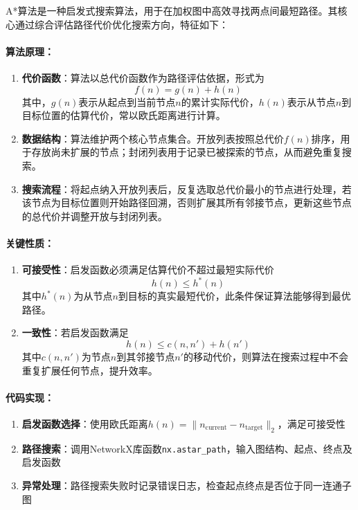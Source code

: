 A*算法是一种启发式搜索算法，用于在加权图中高效寻找两点间最短路径。其核心通过综合评估路径代价优化搜索方向，特征如下：

\paragraph{算法原理：}
\begin{enumerate}
    \item \textbf{代价函数}：算法以总代价函数作为路径评估依据，形式为
    \[
    f(n) = g(n) + h(n)
    \]
    其中，$g(n)$表示从起点到当前节点$n$的累计实际代价，$h(n)$表示从节点$n$到目标位置的估算代价，常以欧氏距离进行计算。

    \item \textbf{数据结构}：算法维护两个核心节点集合。开放列表按照总代价$f(n)$排序，用于存放尚未扩展的节点；封闭列表用于记录已被探索的节点，从而避免重复搜索。

    \item \textbf{搜索流程}：将起点纳入开放列表后，反复选取总代价最小的节点进行处理，若该节点为目标位置则开始路径回溯，否则扩展其所有邻接节点，更新这些节点的总代价并调整开放与封闭列表。
\end{enumerate}

\paragraph{关键性质：}

\begin{enumerate}
    \item \textbf{可接受性}：启发函数必须满足估算代价不超过最短实际代价
    \[
    h(n) \leq h^*(n)
    \]
    其中$h^*(n)$为从节点$n$到目标的真实最短代价，此条件保证算法能够得到最优路径。

    \item \textbf{一致性}：若启发函数满足
    \[
    h(n) \leq c(n, n') + h(n')
    \]
    其中$c(n, n')$为节点$n$到其邻接节点$n'$的移动代价，则算法在搜索过程中不会重复扩展任何节点，提升效率。
\end{enumerate}

\paragraph{代码实现：}
\begin{enumerate}
    \item \textbf{启发函数选择}：使用欧氏距离$h(n) = \|n_{\text{current}} - n_{\text{target}}\|_2$，满足可接受性
    \item \textbf{路径搜索}：调用NetworkX库函数\texttt{nx.astar\_path}，输入图结构、起点、终点及启发函数
    \item \textbf{异常处理}：路径搜索失败时记录错误日志，检查起点终点是否位于同一连通子图
\end{enumerate}
	
